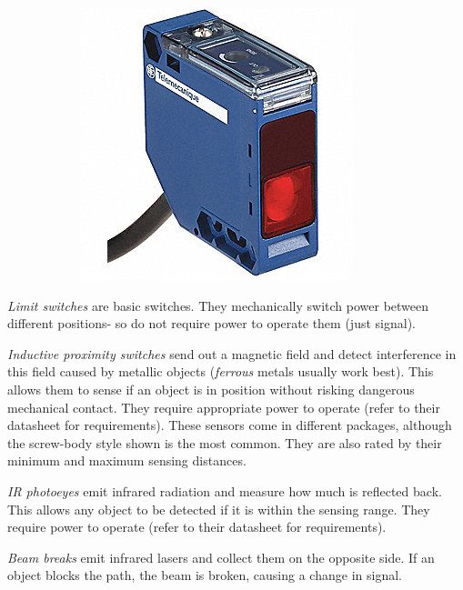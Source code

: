 \begin{figure}[H]
\begin{subfigure}[b]{.31\linewidth}
\includegraphics[width=.8\textwidth]{imgs/sensor_beambreak.jpeg}
\end{subfigure}
\end{figure}

\begin{asparaenum}[a)]
\item \textit{Limit switches} are basic switches. They mechanically switch power between different positions- so do not require power to operate them (just signal).
\item \textit{Inductive proximity switches} send out a magnetic field and detect interference in this field caused by metallic objects (\textit{ferrous} metals usually work best). This allows them to sense if an object is in position without risking dangerous mechanical contact. They require appropriate power to operate (refer to their datasheet for requirements). These sensors come in different packages, although the screw-body style shown is the most common. They are also rated by their minimum and maximum sensing distances.
\item \textit{IR photoeyes} emit infrared radiation and measure how much is reflected back. This allows any object to be detected if it is within the sensing range. They require power to operate (refer to their datasheet for requirements). \item \textit{Beam breaks} emit infrared lasers and collect them on the opposite side. If an object blocks the path, the beam is broken, causing a change in signal. 
\end{asparaenum}

